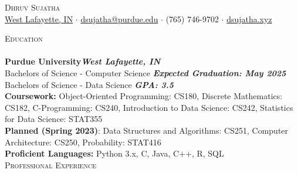 \documentclass[a4paper]{article}
\newcommand{\lineunder} {
    \vspace*{-8pt} \\
    \hspace*{-18pt} \hrulefill \\
}
\newcommand{\header} [1] {
    {\hspace*{-18pt}\vspace*{6pt} \textsc{#1}}
    \vspace*{-6pt} \lineunder
}
\begin{document}
\vspace*{-40pt}

    

\vspace*{-10pt}
\begin{center}
	{\Huge \scshape {Dhruv Sujatha}}\\
	\href{https://www.google.com/maps/place/West+Lafayette,+IN/}{West Lafayette, IN} $\cdot$ \href{mailto:dsujatha@purdue.edu}{dsujatha@purdue.edu} $\cdot$ (765) 746-9702 $\cdot$ \href{https://dsujatha.xyz}{dsujatha.xyz}\\
\end{center}

\header{Education}
\textbf{Purdue University}\hfill \textbf{\textit {West Lafayette, IN}}\\
Bachelor\textquotesingle{}s of Science - Computer Science \hfill \textbf{\textit {Expected Graduation: May 2025}}\\
Bachelor\textquotesingle{}s of Science - Data Science \hfill \textbf{\textit{GPA: 3.5}}\\
\vspace{1mm}
\textbf{Coursework:} Object-Oriented Programming: CS180, Discrete Mathematics: CS182, C-Programming: CS240, Introduction to Data Science: CS242, Statistics for Data Science: STAT355\\
\vspace{1mm}
\textbf{Planned (Spring 2023)}: Data Structures and Algorithms: CS251, Computer Architecture: CS250, Probability: STAT416\\
\vspace{1mm}
\textbf{Proficient Languages:} Python 3.x, C, Java, C++, R, SQL
\vspace{1mm}\\
\header{Professional Experience}
\end{document}
